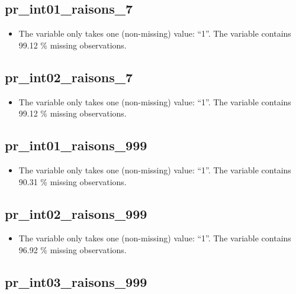 \documentclass[
  letterpaper,
  DIV=11,
  numbers=noendperiod]{scrartcl}
\providecommand{\tightlist}{%
  \setlength{\itemsep}{0pt}\setlength{\parskip}{0pt}}
\begin{document}
\fullline

\subsection{pr\_int01\_raisons\_7}\label{pr_int01_raisons_7}

\begin{itemize}
\tightlist
\item
  The variable only takes one (non-missing) value: ``1''. The variable
  contains 99.12 \% missing observations.
\end{itemize}

\fullline

\subsection{pr\_int02\_raisons\_7}\label{pr_int02_raisons_7}

\begin{itemize}
\tightlist
\item
  The variable only takes one (non-missing) value: ``1''. The variable
  contains 99.12 \% missing observations.
\end{itemize}

\fullline

\subsection{pr\_int01\_raisons\_999}\label{pr_int01_raisons_999}

\begin{itemize}
\tightlist
\item
  The variable only takes one (non-missing) value: ``1''. The variable
  contains 90.31 \% missing observations.
\end{itemize}

\fullline

\subsection{pr\_int02\_raisons\_999}\label{pr_int02_raisons_999}

\begin{itemize}
\tightlist
\item
  The variable only takes one (non-missing) value: ``1''. The variable
  contains 96.92 \% missing observations.
\end{itemize}

\fullline

\subsection{pr\_int03\_raisons\_999}\label{pr_int03_raisons_999}
\end{document}
